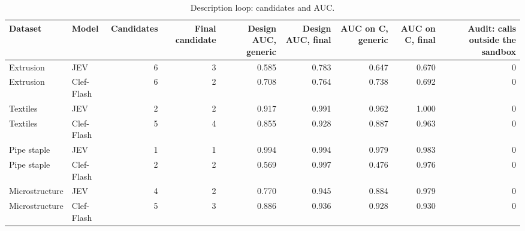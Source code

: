 \begin{table}

\caption{\label{tab:tbl-loop}Description loop: candidates and AUC.}
\centering
\begin{tabular}[t]{llrrrrrrr}
\toprule
Dataset & Model & Candidates & Final candidate & Design AUC, generic & Design AUC, final & AUC on C, generic & AUC on C, final & Audit: calls outside the sandbox\\
\midrule
Extrusion & JEV & 6 & 3 & 0.585 & 0.783 & 0.647 & 0.670 & 0\\
Extrusion & Clef-Flash & 6 & 2 & 0.708 & 0.764 & 0.738 & 0.692 & 0\\
Textiles & JEV & 2 & 2 & 0.917 & 0.991 & 0.962 & 1.000 & 0\\
Textiles & Clef-Flash & 5 & 4 & 0.855 & 0.928 & 0.887 & 0.963 & 0\\
Pipe staple & JEV & 1 & 1 & 0.994 & 0.994 & 0.979 & 0.983 & 0\\
\addlinespace
Pipe staple & Clef-Flash & 2 & 2 & 0.569 & 0.997 & 0.476 & 0.976 & 0\\
Microstructure & JEV & 4 & 2 & 0.770 & 0.945 & 0.884 & 0.979 & 0\\
Microstructure & Clef-Flash & 5 & 3 & 0.886 & 0.936 & 0.928 & 0.930 & 0\\
\bottomrule
\end{tabular}
\end{table}
